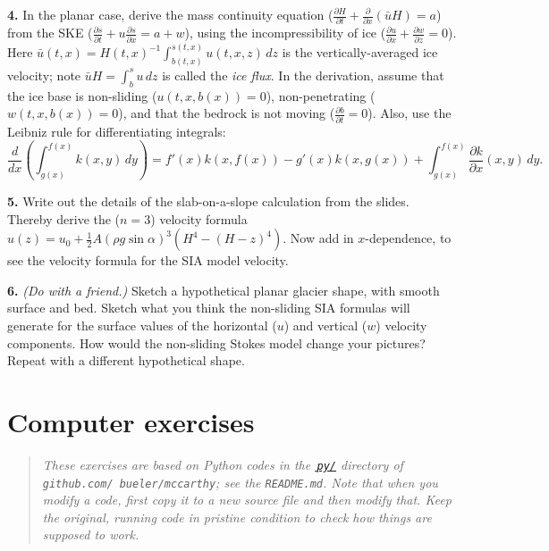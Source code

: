 \documentclass[12pt]{amsart}
\newcommand{\prob}[1]{\bigskip\noindent\textbf{#1.}\quad }
\begin{document}
\prob{4}  In the planar case, derive the mass continuity equation ($\frac{\partial H}{\partial t} + \frac{\partial}{\partial x}(\bar u H) = a$) from the SKE ($\frac{\partial s}{\partial t} + u \frac{\partial s}{\partial x} = a + w$), using the incompressibility of ice ($\frac{\partial u}{\partial x} + \frac{\partial w}{\partial z} = 0$).  Here $\bar u(t,x) = H(t,x)^{-1} \int_{b(t,x)}^{s(t,x)} u(t,x,z)\,dz$ is the vertically-averaged ice velocity; note $\bar u H = \int_b^s u\,dz$ is called the \emph{ice flux}.  In the derivation, assume that the ice base is non-sliding ($u(t,x,b(x))=0$), non-penetrating ($w(t,x,b(x))=0$), and that the bedrock is not moving ($\frac{\partial b}{\partial t} = 0$).  Also, use the Leibniz rule for differentiating integrals:
  $$\frac{d}{dx}\left(\int_{g(x)}^{f(x)} k(x,y)\,dy\right) = f'(x) k(x,f(x)) - g'(x) k(x,g(x)) + \int_{g(x)}^{f(x)} \frac{\partial k}{\partial x}(x,y)\,dy.$$

\prob{5}  Write out the details of the slab-on-a-slope calculation from the slides.  Thereby derive the ($n=3$) velocity formula $u(z) = u_0 + \frac{1}{2} A (\rho g \sin\alpha)^3  \left(H^4 - (H-z)^4\right)$.  Now add in $x$-dependence, to see the velocity formula for the SIA model velocity.

\prob{6}  \emph{(Do with a friend.)}  Sketch a hypothetical planar glacier shape, with smooth surface and bed.  Sketch what you think the non-sliding SIA formulas will generate for the surface values of the horizontal ($u$) and vertical ($w$) velocity components.  How would the non-sliding Stokes model change your pictures?  Repeat with a different hypothetical shape.

\section*{Computer exercises}

\smallskip
\begin{quote}
\emph{These exercises are based on Python codes in the \href{https://github.com/bueler/mccarthy/tree/master/py}{\,\emph{\texttt{py/}}} directory of \emph{\texttt{github.com/ bueler/mccarthy}}; see the \emph{\texttt{README.md}}.  Note that when you modify a code, first copy it to a new source file and then modify that.  Keep the original, running code in pristine condition to check how things are supposed to work.}
\end{quote}
\end{document}
